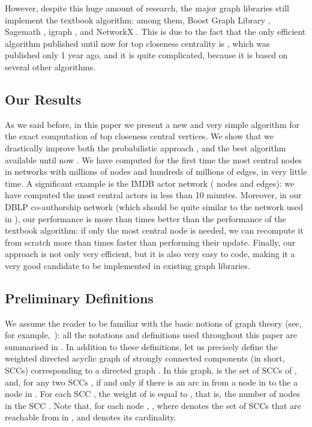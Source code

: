 \documentclass{acm_proc_article-sp}
\begin{document}
However, despite this huge amount of research, the major graph libraries still implement the textbook algorithm: among them, Boost Graph Library \cite{Hagberg2008}, Sagemath \cite{Csardi2006}, igraph \cite{Stein2005}, and NetworkX \cite{Siek2001}. This is due to the fact that the only efficient algorithm published until now for top  closeness centrality is \cite{Olsen2014}, which was published only 1 year ago, and it is quite complicated, because it is based on several other algorithms.

\subsection{Our Results}

As we said before, in this paper we present a new and very simple algorithm for the exact computation of top  closeness central vertices. We show that we drastically improve both the probabilistic approach \cite{Okamoto2008}, and the best algorithm available until now \cite{Olsen2014}. We have computed for the first time the  most central nodes in networks with millions of nodes and hundreds of millions of edges, in very little time. A significant example is the IMDB actor network ( nodes and  edges): we have computed the  most central actors in less than 10 minutes. Moreover, in our DBLP co-authorship network (which should be quite similar to the network used in \cite{Saryuce2013}), our performance is more than  times better than the performance of the textbook algorithm: if only the most central node is needed, we can recompute it from scratch more than  times faster than performing their update. Finally, our approach is not only very efficient, but it is also very easy to code, making it a very good candidate to be implemented in existing graph libraries.

\subsection{Preliminary Definitions}\label{sec:defs}

We assume the reader to be familiar with the basic notions of graph theory (see, for example,~\cite{Cormen2009}): all the notations and definitions used throughout this paper are summarised in . In addition to these definitions, let us precisely define the weighted directed acyclic graph  of strongly connected components (in short, SCCs) corresponding to a directed graph . In this graph,  is the set of SCCs of , and, for any two SCCs ,  if and only if there is an arc in  from a node in  to the a node in . For each SCC , the weight  of  is equal to , that is, the number of nodes in the SCC . Note that, for each node , , where  denotes the set of SCCs that are reachable from  in , and  denotes its cardinality.
\end{document}
